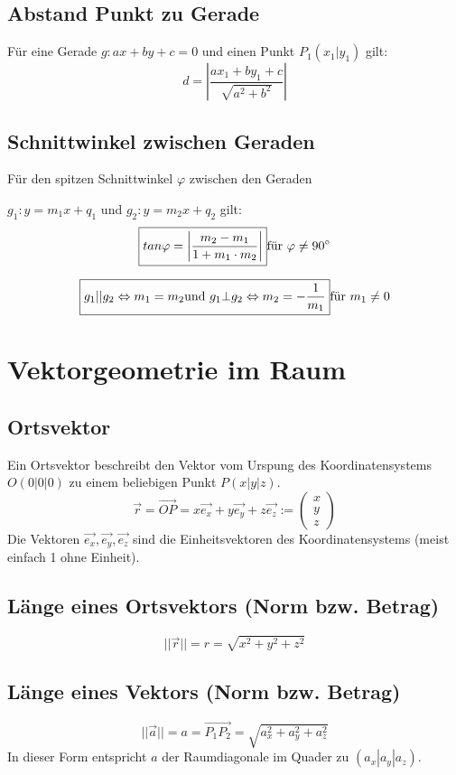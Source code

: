 \subsection{Abstand Punkt zu Gerade}
Für eine Gerade $g: ax + by + c = 0$ und einen Punkt $P_1 (x_1 | y_1)$ gilt:
\[ \boxed{ d = \left| \frac{ax_1 + by_1 + c}{\sqrt{a^2 + b^2}} \right| } \]

\subsection{Schnittwinkel zwischen Geraden}
Für den spitzen Schnittwinkel $\varphi$ zwischen den Geraden 

$g_1: y = m_1x + q_1$ und $g_2: y = m_2x + q_2$ gilt:
\[ \boxed{ tan\varphi = \left| \frac{m_2 - m_1}{1 + m_1 \cdot m_2} \right| } \\ \text{für } \varphi \neq 90^{\circ} \]

\[ \boxed{ g_1 || g_2 \Leftrightarrow m_1 = m_2 \text{und } g_1 \bot g_2 \Leftrightarrow m_2 = - \frac{1}{m_1} } \\ \text{für } m_1 \neq 0 \]

\section{Vektorgeometrie im Raum}

\subsection{Ortsvektor}
Ein Ortsvektor beschreibt den Vektor vom Urspung des Koordinatensystems $O(0|0|0)$ zu einem beliebigen Punkt $P(x|y|z)$.
\[	\boxed{ \vec{r} = \overrightarrow{OP} = x\vec{e_x} + y\vec{e_y} + z\vec{e_z} :=
	\left( 
	  \begin{array}{ccc} 
	    x \\ y \\ z
	  \end{array}
	\right) }
\]
\noindent
Die Vektoren $\vec{e_x},\vec{e_y},\vec{e_z}$ sind die Einheitsvektoren des Koordinatensystems (meist einfach 1 ohne Einheit).
\subsection{Länge eines Ortsvektors (Norm bzw. Betrag)}
\[ \boxed{ ||\vec{r}|| = r = \sqrt{x^2 + y^2 + z^2} } \]

\subsection{Länge eines Vektors (Norm bzw. Betrag)}
\[ \boxed{ ||\vec{a}|| = a = \overrightarrow{P_1P_2} = \sqrt{a_x^2 + a_y^2 + a_z^2} } \]
In dieser Form entspricht $a$ der Raumdiagonale im Quader zu $(a_x|a_y|a_z)$.

